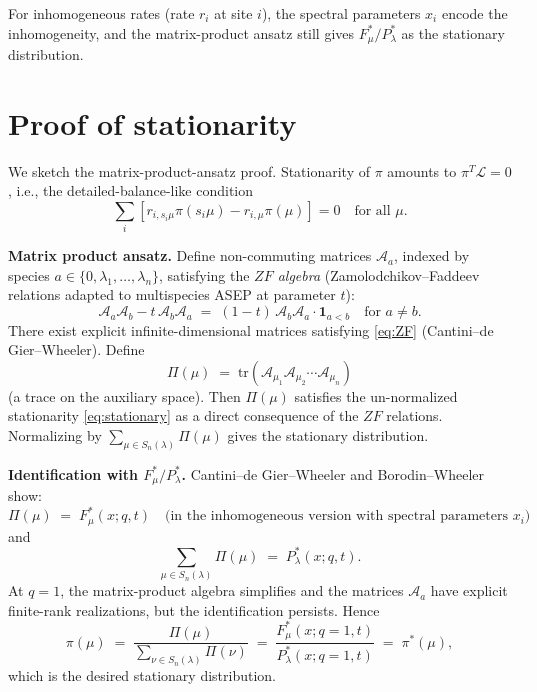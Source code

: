 For inhomogeneous rates (rate $r_i$ at site $i$), the spectral parameters $x_i$ encode the inhomogeneity, and the matrix-product ansatz still gives $F^*_\mu/P^*_\lambda$ as the stationary distribution.

\section*{Proof of stationarity}

We sketch the matrix-product-ansatz proof.  Stationarity of $\pi$ amounts to $\pi^T\mathcal L=0$, i.e., the detailed-balance-like condition
\begin{equation}\label{eq:stationary}
\sum_i [r_{i,s_i\mu}\pi(s_i\mu) - r_{i,\mu}\pi(\mu)]=0\quad\text{for all }\mu.
\end{equation}

\medskip
\noindent\textbf{Matrix product ansatz.}  Define non-commuting matrices $\mathcal A_a$, indexed by species $a\in\{0,\lambda_1,\ldots,\lambda_n\}$, satisfying the \emph{$ZF$ algebra} (Zamolodchikov--Faddeev relations adapted to multispecies ASEP at parameter $t$):
\begin{equation}\label{eq:ZF}
\mathcal A_a\mathcal A_b - t\,\mathcal A_b\mathcal A_a \;=\; (1-t)\,\mathcal A_b\mathcal A_a\cdot\mathbf 1_{a<b}\quad\text{for }a\ne b.
\end{equation}
There exist explicit infinite-dimensional matrices satisfying \eqref{eq:ZF} (Cantini--de Gier--Wheeler).  Define
\[
\Pi(\mu) \;=\; \mathrm{tr}(\mathcal A_{\mu_1}\mathcal A_{\mu_2}\cdots\mathcal A_{\mu_n})
\]
(a trace on the auxiliary space).  Then $\Pi(\mu)$ satisfies the un-normalized stationarity \eqref{eq:stationary} as a direct consequence of the $ZF$ relations.  Normalizing by $\sum_{\mu\in S_n(\lambda)}\Pi(\mu)$ gives the stationary distribution.

\medskip
\noindent\textbf{Identification with $F^*_\mu/P^*_\lambda$.}  Cantini--de Gier--Wheeler \cite{CGdGW16} and Borodin--Wheeler \cite{BW18} show:
\[
\Pi(\mu)\;=\;F^*_\mu(x;q,t)\quad\text{(in the inhomogeneous version with spectral parameters }x_i\text{)}
\]
and
\[
\sum_{\mu\in S_n(\lambda)}\Pi(\mu)\;=\;P^*_\lambda(x;q,t).
\]
At $q=1$, the matrix-product algebra simplifies and the matrices $\mathcal A_a$ have explicit finite-rank realizations, but the identification persists.  Hence
\[
\pi(\mu) \;=\; \frac{\Pi(\mu)}{\sum_{\nu\in S_n(\lambda)}\Pi(\nu)} \;=\; \frac{F^*_\mu(x;q=1,t)}{P^*_\lambda(x;q=1,t)} \;=\;\pi^*(\mu),
\]
which is the desired stationary distribution.

